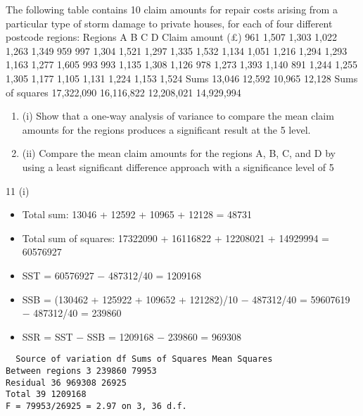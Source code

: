 \documentclass[a4paper,12pt]{article}
\begin{document}
The following table contains 10 claim amounts for repair costs arising from a
particular type of storm damage to private houses, for each of four different postcode
regions:
Regions
A B C D
Claim amount (£) 961 1,507 1,303 1,022
1,263 1,349 959 997
1,304 1,521 1,297 1,335
1,532 1,134 1,051 1,216
1,294 1,293 1,163 1,277
1,605 993 993 1,135
1,308 1,126 978 1,273
1,393 1,140 891 1,244
1,255 1,305 1,177 1,105
1,131 1,224 1,153 1,524
Sums 13,046 12,592 10,965 12,128
Sums of squares 17,322,090 16,116,822 12,208,021 14,929,994
\begin{enumerate}
\item (i) Show that a one-way analysis of variance to compare the mean claim amounts
for the regions produces a significant result at the 5%
level. 
\item (ii) Compare the mean claim amounts for the regions A, B, C, and D by using a
least significant difference approach with a significance level of 5%
\end{enumerate}


\newpage

11 (i) 
\begin{itemize}
    \item Total sum: 13046 + 12592 + 10965 + 12128 = 48731
    \item Total sum of squares: 17322090 + 16116822 + 12208021 + 14929994
= 60576927
    \item SST = 60576927 − 487312/40 = 1209168

    \item SSB = (130462 + 125922 + 109652 + 121282)/10 − 487312/40
= 59607619 − 487312/40 = 239860
    \item SSR = SST − SSB = 1209168 − 239860 = 969308
\end{itemize}

\begin{verbatim}
  Source of variation df Sums of Squares Mean Squares
Between regions 3 239860 79953
Residual 36 969308 26925
Total 39 1209168
F = 79953/26925 = 2.97 on 3, 36 d.f.  
\end{verbatim}
\end{document}

